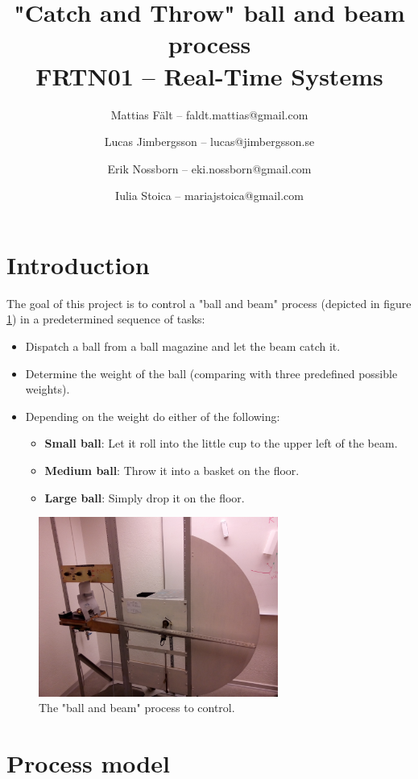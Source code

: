\documentclass{article}
\title{"Catch and Throw" ball and beam process\\FRTN01 -- Real-Time Systems}
\author{
Mattias Fält -- faldt.mattias@gmail.com
\and
Lucas Jimbergsson -- lucas@jimbergsson.se
\and
Erik Nossborn -- eki.nossborn@gmail.com
\and
Iulia Stoica -- mariajstoica@gmail.com
}
\begin{document}
\maketitle
\newpage

\tableofcontents
\newpage

\section{Introduction}
The goal of this project is to control a "ball and beam" process (depicted in figure \ref{process_fig}) in a predetermined sequence of tasks:
\begin{itemize}
\item Dispatch a ball from a ball magazine and let the beam catch it.
\item Determine the weight of the ball (comparing with three predefined possible weights).
\item Depending on the weight do either of the following:
\begin{itemize}
\item \textbf{Small ball}: Let it roll into the little cup to the upper left of the beam.
\item \textbf{Medium ball}: Throw it into a basket on the floor.
\item \textbf{Large ball}: Simply drop it on the floor.
\end{itemize}
\end{itemize}
\begin{figure}
\centering
\includegraphics[width=0.7\textwidth]{figures/process_fig.jpg}
\caption{The "ball and beam" process to control.}\label{process_fig}
\end{figure}

\section{Process model}

\end{document}
